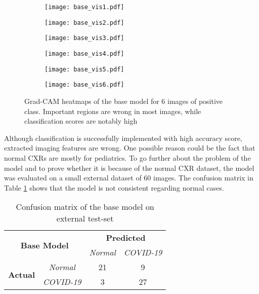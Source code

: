 \documentclass{article}
\begin{document}
\begin{figure}[H]
    \begin{subfigure}{0.33\linewidth}
        \centering
        \texttt{[image: base\_vis1.pdf]}
        \label{fig:base_vis1}
    \end{subfigure}
\begin{subfigure}{0.33\linewidth}
        \centering
        \texttt{[image: base\_vis2.pdf]}
        \label{fig:base_vis2}
    \end{subfigure}
\begin{subfigure}{0.33\linewidth}
        \centering
        \texttt{[image: base\_vis3.pdf]}
        \label{fig:base_vis3}
    \end{subfigure}
    \begin{subfigure}{0.33\linewidth}
        \centering
        \texttt{[image: base\_vis4.pdf]}
        \label{fig:base_vis4}
    \end{subfigure}
    \begin{subfigure}{0.33\linewidth}
        \centering
        \texttt{[image: base\_vis5.pdf]}
        \label{fig:base_vis5}
    \end{subfigure}
    \begin{subfigure}{0.33\linewidth}
        \centering
        \texttt{[image: base\_vis6.pdf]}
        \label{fig:base_vis6}
    \end{subfigure}
\caption{Grad-CAM heatmaps of the base model for 6 images of positive class. Important regions are wrong in most images, while classification scores are notably high}
\label{fig:base_heatmaps}
\end{figure}

Although classification is successfully implemented with high accuracy score, extracted imaging features are wrong. One possible reason could be the fact that normal CXRs are mostly for pediatrics. To go further about the problem of the model and to prove whether it is because of the normal CXR dataset, the model was evaluated on a small external dataset of 60 images. The confusion matrix in Table \ref{base_model_table} shows that the model is not consistent regarding normal cases.

\begin{table}[H]
\renewcommand\thetable{1}
\caption{Confusion matrix of the base model on external test-set}
\label{base_model_table}
\centering
\begin{tabular}{|c|c|c|c|}
\hline
\multicolumn{2}{|c|}{\multirow{2}{*}{\textbf{Base Model}}} & \multicolumn{2}{c|}{\textbf{Predicted}} \\ \cline{3-4} 
\multicolumn{2}{|c|}{}                                     & \textit{Normal}   & \textit{COVID-19}   \\ \hline
\multirow{2}{*}{\textbf{Actual}}    & \textit{Normal}      & 21                & 9                   \\ \cline{2-4} 
                                    & \textit{COVID-19}    & 3                 & 27                  \\ \hline
\end{tabular}
\end{table}
\end{document}
